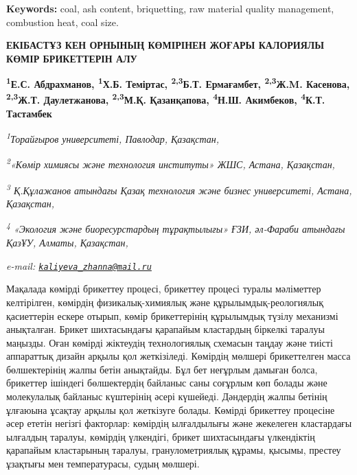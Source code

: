{\bfseries Keywords:} coal, ash content, briquetting, raw material quality
management, combustion heat, coal size.

\begin{articleheader}
{\bfseries ЕКІБАСТҰЗ КЕН ОРНЫНЫҢ КӨМІРІНЕН ЖОҒАРЫ КАЛОРИЯЛЫ КӨМІР БРИКЕТТЕРІН АЛУ}

{\bfseries
\textsuperscript{1}Е.С. Абдрахманов,
\textsuperscript{1}Х.Б. Теміртас,
\textsuperscript{2,3}Б.Т. Ермағамбет,
\textsuperscript{2,3}Ж.M. Касенова,
\textsuperscript{2,3}Ж.Т. Даулетжанова\textsuperscript{\envelope },
\textsuperscript{2,3}М.Қ. Қазанқапова,
\textsuperscript{4}Н.Ш. Акимбеков,
\textsuperscript{4}К.Т. Тастамбек}
\end{articleheader}

\begin{affiliation}
\emph{\textsuperscript{1}Торайғыров университеті, Павлодар, Қазақстан,}

\emph{\textsuperscript{2}«Көмір химиясы және технология институты» ЖШС, Астана, Қазақстан,}

\emph{\textsuperscript{3} Қ.Құлажанов атындағы Қазақ технология және бизнес университеті, Астана, Қазақстан,}

\emph{\textsuperscript{4} «Экология және биоресурстардың тұрақтылығы» ҒЗИ, әл-Фараби атындағы ҚазҰУ, Алматы, Қазақстан,}

\emph{e-mail: \href{mailto:kaliyeva_zhanna@mail.ru}{\nolinkurl{kaliyeva\_zhanna@mail.ru}}}
\end{affiliation}

Мақалада көмірді брикеттеу процесі, брикеттеу процесі туралы мәліметтер
келтірілген, көмірдің физикалық-химиялық және құрылымдық-реологиялық
қасиеттерін ескере отырып, көмір брикеттерінің құрылымдық түзілу
механизмі анықталған. Брикет шихтасындағы қарапайым кластардың біркелкі
таралуы маңызды. Оған көмірді жіктеудің технологиялық схемасын таңдау
және тиісті аппараттық дизайн арқылы қол жеткізіледі. Көмірдің мөлшері
брикеттелген масса бөлшектерінің жалпы бетін анықтайды. Бұл бет неғұрлым
дамыған болса, брикеттер ішіндегі бөлшектердің байланыс саны соғұрлым
көп болады және молекулалық байланыс күштерінің әсері күшейеді.
Дәндердің жалпы бетінің ұлғаюына ұсақтау арқылы қол жеткізуге болады.
Көмірді брикеттеу процесіне әсер ететін негізгі факторлар: көмірдің
ылғалдылығы және жекелеген кластардағы ылғалдың таралуы, көмірдің
үлкендігі, брикет шихтасындағы үлкендіктің қарапайым кластарының
таралуы, гранулометриялық құрамы, қысымы, престеу ұзақтығы мен
температурасы, судың мөлшері.

